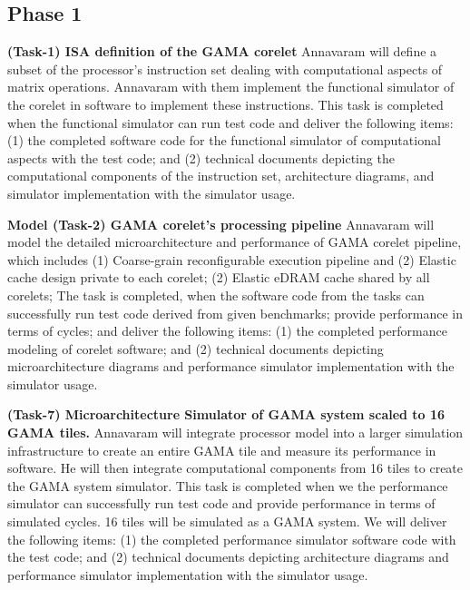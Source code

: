 \noindent

\subsection{Phase 1}
\noindent
\textbf{(Task-1) ISA definition of the GAMA corelet} 
 Annavaram  will define a subset of the processor's instruction set dealing with computational aspects of matrix operations. Annavaram with them implement the functional simulator of the corelet in software to implement these instructions.
This task is completed when the functional simulator can run test code and deliver the following items: 
(1) the completed software code for the functional simulator of computational aspects with the test code; and (2) technical documents depicting the computational components of the instruction set, architecture diagrams, and simulator implementation with the simulator usage.


\vspace{3pt}
\noindent
\textbf{Model (Task-2) GAMA corelet's processing pipeline}
Annavaram will model the detailed microarchitecture and performance of GAMA corelet pipeline, which includes (1) Coarse-grain reconfigurable execution pipeline and (2) Elastic cache design private to each corelet; (2) Elastic eDRAM cache shared by all corelets; 
The task is completed, when the software code from the tasks can successfully run test code derived from given benchmarks; provide performance in terms of cycles; and deliver the following items:
(1) the completed performance modeling of corelet software; and (2) technical documents depicting microarchitecture diagrams and performance simulator implementation with the simulator usage.

\vspace{3pt}
\noindent
\textbf{(Task-7) Microarchitecture Simulator of GAMA system scaled to 16 GAMA tiles.}
 Annavaram will integrate processor model into a larger simulation infrastructure to create an entire GAMA tile and measure its performance in software. He will then integrate computational components from 16 tiles to create the GAMA system simulator. 
This task is completed when we the performance simulator can successfully run test code and  provide performance in terms of simulated cycles. 16 tiles will be simulated as a GAMA system. We will deliver the following items:
(1) the completed performance simulator software code with the test code; and (2) technical documents depicting architecture diagrams and performance simulator implementation with the simulator usage.


